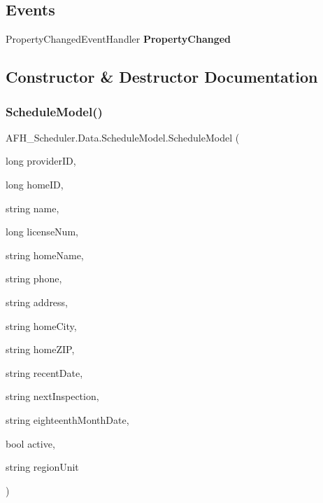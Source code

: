 \subsection*{Events}
\begin{DoxyCompactItemize}
\item 
Property\+Changed\+Event\+Handler \textbf{ Property\+Changed}
\end{DoxyCompactItemize}


\subsection{Constructor \& Destructor Documentation}
\mbox{\label{class_a_f_h___scheduler_1_1_data_1_1_schedule_model_a66efeb285a739d36a5dc64dc55aeb1dd}} 
\subsubsection{ScheduleModel()\hspace{0.1cm}{\footnotesize\ttfamily [1/2]}}
{\footnotesize\ttfamily A\+F\+H\+\_\+\+Scheduler.\+Data.\+Schedule\+Model.\+Schedule\+Model (\begin{DoxyParamCaption}\item[{long}]{provider\+ID,  }\item[{long}]{home\+ID,  }\item[{string}]{name,  }\item[{long}]{license\+Num,  }\item[{string}]{home\+Name,  }\item[{string}]{phone,  }\item[{string}]{address,  }\item[{string}]{home\+City,  }\item[{string}]{home\+Z\+IP,  }\item[{string}]{recent\+Date,  }\item[{string}]{next\+Inspection,  }\item[{string}]{eighteenth\+Month\+Date,  }\item[{bool}]{active,  }\item[{string}]{region\+Unit }\end{DoxyParamCaption})}

\mbox{\label{class_a_f_h___scheduler_1_1_data_1_1_schedule_model_a6e7045c3e1e57baf785e585062219916}} 
